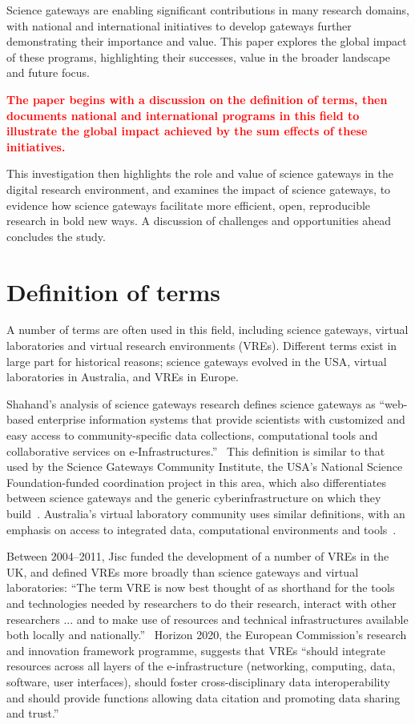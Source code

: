 \documentclass[review]{elsarticle}
\newcommand{\changedtext}[1]{
	\textcolor{red}{\textbf{#1}}
}
\begin{document}
Science gateways are enabling significant contributions in many research domains, with national and international initiatives to develop gateways further demonstrating their importance and value. 
This paper explores the global impact of these programs, highlighting their successes, value in the broader landscape and future focus. 
\changedtext{The paper begins with a discussion on the definition of terms, then documents national and international programs in this field to illustrate the global impact achieved by  the sum effects of these  initiatives.}
This investigation then highlights the role and value of science gateways in the digital research environment, and examines the impact of science gateways, to evidence how science gateways facilitate more efficient, open, reproducible research in bold new ways. 
A discussion of challenges and opportunities ahead concludes the study. 

\section{Definition of terms}

A number of terms are often used in this field, including science gateways, virtual laboratories and virtual research environments (VREs). Different terms exist in large part for historical reasons; science gateways evolved in the USA, virtual laboratories in Australia, and VREs in Europe. 

Shahand's analysis of science gateways research defines science gateways as ``web-based enterprise information systems that provide scientists with customized and easy access to community-specific data collections, computational tools and collaborative services on e-Infrastructures.''~\cite{shahand2015-1} This definition is similar to that used by the Science Gateways Community Institute, the USA's National Science Foundation-funded coordination project in this area, which also differentiates between science gateways and the generic cyberinfrastructure on which they build~\cite{what-is-sg-2}. Australia's virtual laboratory community uses similar definitions, with an emphasis on access to integrated data, computational environments and tools~\cite{nectar-impact-3}. 

Between 2004--2011, Jisc funded the development of a number of VREs in the UK, and defined VREs more broadly than science gateways and virtual laboratories: ``The term VRE is now best thought of as shorthand for the tools and technologies needed by researchers to do their research, interact with other researchers ... and to make use of resources and technical infrastructures available both locally and nationally.''~\cite{jisc-vre-4} Horizon 2020, the European Commission's research and innovation framework programme, suggests that VREs ``should integrate resources across all layers of the e-infrastructure (networking, computing, data, software, user interfaces), should foster cross-disciplinary data interoperability and should provide functions allowing data citation and promoting data sharing and trust.''~\cite{h2020-vre-5} 
\end{document}
